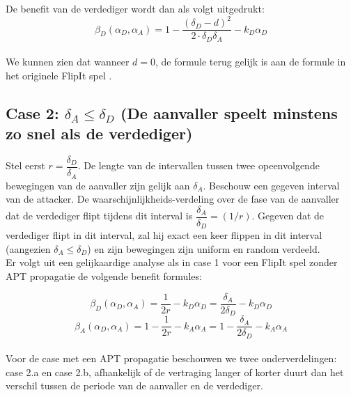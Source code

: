 \documentclass[master=cws, masteroption=vs,english]{kulemt}
\begin{document}
\begin{abstract*}
 
De benefit van de verdediger wordt dan als volgt uitgedrukt:
 \begin{equation}\label{first}
\beta_{D}(\alpha_{D},\alpha_{A}) = 1 - \dfrac { (\delta_{D}-d) ^{2}} {2 \cdot \delta_{D}  \delta_{A}} - k_{D} \alpha_{D}
\end{equation}
~~\\
We kunnen zien dat wanneer $d=0$, de formule terug gelijk is aan de formule in het originele FlipIt spel \citep{FlipIt}. \\


\subsection*{\textbf{Case 2:} $\delta_{A} \leq \delta_{D} $ (De aanvaller speelt minstens zo snel als de verdediger)}

Stel eerst $r = \dfrac{\delta_{D}}{ \delta_{A} }$. De lengte van de intervallen tussen twee opeenvolgende bewegingen van de aanvaller zijn gelijk aan $\delta_{A}$. Beschouw een gegeven interval van de attacker. De waarschijnlijkheids-verdeling over de fase van de aanvaller dat de verdediger flipt tijdens dit interval is $\dfrac{\delta_{A}}{ \delta_{D} } = (1/r)$. Gegeven dat de verdediger flipt in dit interval, zal hij exact een keer flippen in dit interval (aangezien $\delta_{A} \leq \delta_{D} $) en zijn bewegingen zijn uniform en random verdeeld. \\

Er volgt uit een gelijkaardige analyse als in case 1 voor een FlipIt spel zonder APT propagatie de volgende benefit formules:

\begin{equation}\label{first}
\beta_{D}(\alpha_{D},\alpha_{A}) = \dfrac {1} {2r} - k_{D} \alpha_{D} = \dfrac {\delta_{A}} {2\delta_{D}} - k_{D} \alpha_{D} 
\end{equation}
\begin{equation}\label{first}
\beta_{A}(\alpha_{D},\alpha_{A}) =1 - \dfrac {1} {2r} - k_{A} \alpha_{A} = 1- \dfrac {\delta_{A}} {2\delta_{D}} - k_{A} \alpha_{A}  
\end{equation}\\

Voor de case met een APT propagatie beschouwen we twee onderverdelingen: case 2.a en case 2.b, afhankelijk of de vertraging langer of korter duurt dan het verschil tussen de periode van de aanvaller en de verdediger.\\



\end{abstract*}
\end{document}

